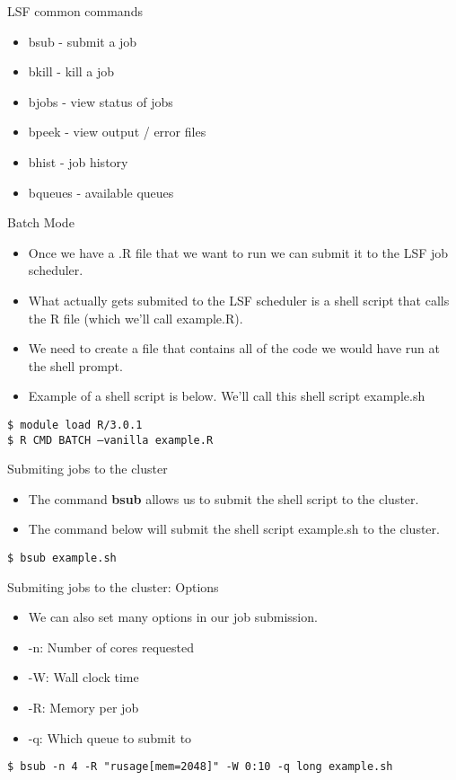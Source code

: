 \begin{frame}{LSF common commands}
\begin{itemize}
\item bsub - submit a job
\item bkill - kill a job
\item bjobs - view status of jobs
\item bpeek - view output / error files
\item bhist - job history
\item bqueues - available queues
\end{itemize}
\end{frame}







\begin{frame}{Batch Mode}
\begin{itemize}
\item Once we have a .R file that we want to run we can submit it to the LSF job scheduler.  
\item What actually gets submited to the LSF scheduler is a shell script that calls the R file (which we'll call example.R). 
\item We need to create a file that contains all of the code we would have run at the shell prompt.  
\item Example of a shell script is below. We'll call this shell script example.sh
\end{itemize}
{\tt \$ module load R/3.0.1 }\\
{\tt \$ R CMD BATCH --vanilla example.R}\\
\end{frame}

\begin{frame}{Submiting jobs to the cluster}
\begin{itemize}
\item The command {\bf bsub} allows us to submit the shell script to the cluster. 
\item The command below will submit the shell script example.sh to the cluster.  
\end{itemize}
{\tt \$ bsub example.sh}
\end{frame}


\begin{frame}{Submiting jobs to the cluster: Options}
\begin{itemize}
\item We can also set many options in our job submission. 
\item -n: Number of cores requested
\item -W: Wall clock time
\item -R: Memory per job
\item -q: Which queue to submit to
\end{itemize}
{\tt \$ bsub -n 4 -R "rusage[mem=2048]" -W 0:10 -q long example.sh}
\end{frame}




